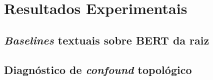 
\chapter{Resultados Experimentais}
\label{cap:resultados}


\section{\emph{Baselines} textuais sobre BERT da raiz}
\label{sec:baseline_textual}

%



%

\section{Diagn\'ostico de \emph{confound} topol\'ogico}
\label{sec:confound}

%
%
%

